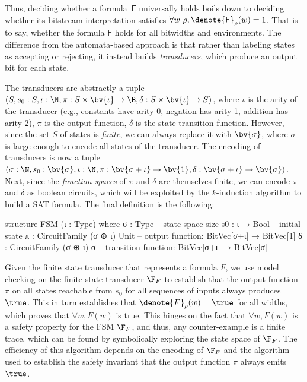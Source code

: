 Thus, deciding whether a formula~$\mathsf F$ universally holds boils down to
deciding whether its bitstream interpretation satisfies $\forall w~\rho,
\denote{\mathsf F}_\rho(w) = 1$.
%
That is to say, whether the formula $\mathsf F$ holds for all bitwidths and
environments. The difference from the automata-based approach is that rather
than labeling states as accepting or rejecting, it instead builds
\emph{transducers}, which produce an output bit for each state.

The transducers are abstractly a tuple $(S, s_0 : S, \iota : \N, \pi : S \times
\bv{\iota} \to \B, \delta : S \times \bv{\iota} \to S)$, where $\iota$ is the
arity of the transducer (e.g., constants have arity 0, negation has arity 1,
addition has arity 2), $\pi$ is the output function, $\delta$ is the state
transition function. However, since the set $S$ of states is \emph{finite}, we
can always replace it with $\bv{\sigma}$, where $\sigma$ is large enough to
encode all states of the transducer.
%
The encoding of transducers is now a tuple $(\sigma : \N, s_0 :
\bv{\sigma}, \iota : \N, \pi : \bv{\sigma+\iota} \to \bv{1}, \delta :
\bv{\sigma+\iota} \to \bv{\sigma})$.
%
Next, since the \emph{function spaces} of $\pi$ and $\delta$ are themselves
finite, we can encode $\pi$ and $\delta$ as boolean circuits, which will be
exploited by the $k$-induction algorithm to build a SAT formula.
%
The final definition is the following:
%
\begin{lean}
structure FSM (ι  : Type) where
  σ  : Type  -- state space size
  s0 : ι → Bool -- initial state
  π  : CircuitFamily (σ ⊕ ι) Unit -- output function: BitVec[σ+ι] → BitVec[1]
  δ  : CircuitFamily (σ ⊕ ι) σ -- transition function: BitVec[σ+ι] → BitVec[σ]
\end{lean}


Given the finite state transducer that represents a formula $F$,
we use model checking on the finite state transducer $\F_F$ to establish that the
output function $\pi$ on all states reachable from $s_0$ for all sequences of inputs always produces $\true$.
This in turn establishes that $\denote{F}_\rho(w) = \true$ for all widths,
which proves that $\forall w, F(w)$ is true.
This hinges on the fact that $\forall w, F(w)$ is a safety property for the FSM
$\F_F$, and thus, any counter-example is a finite trace, which can be found by
symbolically exploring the state space of $\F_F$. The efficiency of this
algorithm depends on the encoding of $\F_F$ and the algorithm used to establish
the safety invariant that the output function $\pi$ always emits $\true$.

